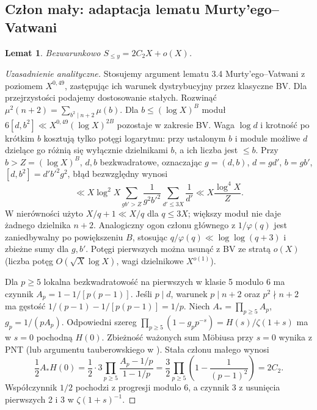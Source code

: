 \documentclass[11pt,a4paper]{article}
\newtheorem{lem}[tw]{Lemat}
\theoremstyle{definition}\newtheorem{defn}[tw]{Definicja}
\theoremstyle{remark}\newtheorem*{uw}{Uwaga}
\begin{document}
\subsection{Człon mały: adaptacja lematu Murty'ego--Vatwani}
\begin{lem}\label{lem:small}
Bezwarunkowo $S_{\le y}=2C_2X+o(X)$.
\end{lem}
\begin{proof}[Uzasadnienie analityczne]
Stosujemy argument lematu 3.4 Murty'ego--Vatwani \cite{mv} z poziomem
$X^{0{,}49}$, zastępując ich warunek dystrybucyjny przez klasyczne BV.
Dla przejrzystości podajemy dostosowanie stałych. Rozwinąć
$\mu^2(n+2)=\sum_{b^2\mid n+2}\mu(b)$. Dla $b\le(\log X)^B$ moduł
$6[d,b^2]\ll X^{0{,}49}(\log X)^{2B}$ pozostaje w zakresie BV.
Waga $\log d$ i krotność po krótkim $b$ kosztują tylko potęgi logarytmu:
przy ustalonym $b$ i module możliwe $d$ dzielące go różnią się wyłącznie
dzielnikami $b$, a ich liczba jest $\le b$. Przy $b>Z=(\log X)^B$,
$d,b$ bezkwadratowe, oznaczając $g=(d,b)$, $d=gd'$, $b=gb'$,
$[d,b^2]=d'b'^2g^2$, błąd bezwzględny wynosi
\[
 \ll X\log^2X\sum_{gb'>Z}\frac{1}{g^2b'^2}
       \sum_{d'\le 3X}\frac1{d'}\ll X\frac{\log^4X}{Z}.
\]
W nierówności użyto $X/q+1\ll X/q$ dla $q\le3X$; większy moduł nie daje
żadnego dzielnika $n+2$. Analogiczny ogon członu głównego z $1/\varphi(q)$
jest zaniedbywalny po powiększeniu $B$, stosując $q/\varphi(q)\ll\log\log(q+3)$
i zbieżne sumy dla $g,b'$. Potęgi pierwszych można usunąć z BV ze stratą
$o(X)$ (liczba potęg $O(\sqrt X\log X)$, wagi dzielnikowe $X^{o(1)}$).

Dla $p\ge5$ lokalna bezkwadratowość na pierwszych w klasie 5 modulo 6 ma
czynnik $A_p=1-1/[p(p-1)]$. Jeśli $p\mid d$, warunek $p\mid n+2$ oraz
$p^2\nmid n+2$ ma gęstość $1/(p-1)-1/[p(p-1)]=1/p$.
Niech $A_* =\prod_{p\ge5} A_p$, $g_p=1/(pA_p)$. Odpowiedni szereg
$\prod_{p\ge5}(1-g_p p^{-s})=H(s)/\zeta(1+s)$ ma w $s=0$ pochodną
$H(0)$. Zbieżność ważonych sum Möbiusa przy $s=0$ wynika z PNT
(lub argumentu tauberowskiego w \cite{mv}). Stała członu małego wynosi
\[
 \frac12 A_* H(0)=\frac12\cdot3\prod_{p\ge5}
 \frac{A_p-1/p}{1-1/p}=
 \frac32\prod_{p\ge5}\left(1-\frac1{(p-1)^2}\right)=2C_2.
\]
Współczynnik $1/2$ pochodzi z progresji modulo 6, a czynnik 3 z usunięcia
pierwszych 2 i 3 w $\zeta(1+s)^{-1}$.
\end{proof}
\end{document}

